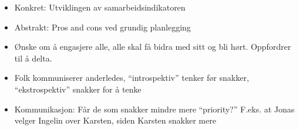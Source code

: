 \begin{itemize}
\item Konkret: Utviklingen av samarbeidsindikatoren
\item Abstrakt: Pros and cons ved grundig planlegging
\item Ønske om å engasjere alle, alle skal få bidra med sitt og bli hørt. Oppfordrer til å delta.
\item Folk kommuniserer anderledes, “introspektiv” tenker før snakker, “ekstrospektiv” snakker for å tenke
\item Kommunikasjon: Får de som snakker mindre mere “priority?” F.eks. at Jonas velger Ingelin over Karsten, siden Karsten snakker mere
\end{itemize}





















